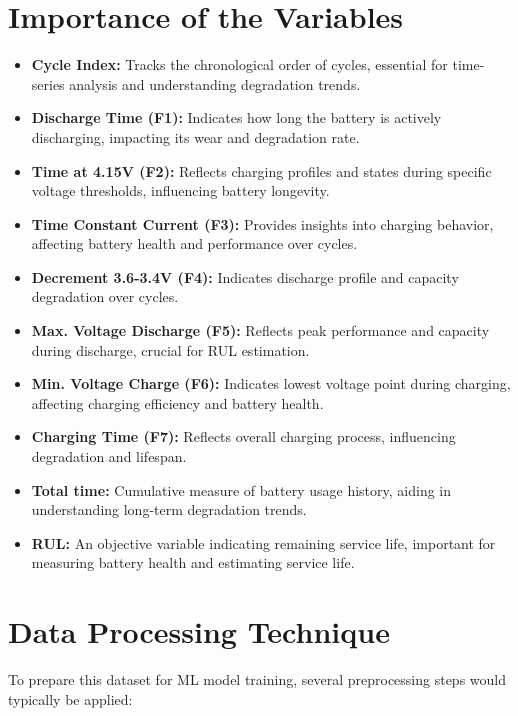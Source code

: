 \section{Importance of the Variables}

\begin{itemize}
    \item \textbf{Cycle Index:} Tracks the chronological order of cycles, essential for time-series analysis and understanding degradation trends.
    \item \textbf{Discharge Time (F1):} Indicates how long the battery is actively discharging, impacting its wear and degradation rate.
    \item \textbf{Time at 4.15V (F2):} Reflects charging profiles and states during specific voltage thresholds, influencing battery longevity.
    \item \textbf{Time Constant Current (F3):} Provides insights into charging behavior, affecting battery health and performance over cycles.
    \item \textbf{Decrement 3.6-3.4V (F4):} Indicates discharge profile and capacity degradation over cycles.
    \item \textbf{Max. Voltage Discharge (F5):} Reflects peak performance and capacity during discharge, crucial for RUL estimation.
    \item \textbf{Min. Voltage Charge (F6):} Indicates lowest voltage point during charging, affecting charging efficiency and battery health.
    \item \textbf{Charging Time (F7):} Reflects overall charging process, influencing degradation and lifespan.
    \item \textbf{Total time:} Cumulative measure of battery usage history, aiding in understanding long-term degradation trends.
    \item \textbf{RUL:} An objective variable indicating remaining service life, important for measuring battery health and estimating service life.
\end{itemize}

\section{Data Processing Technique}

To prepare this dataset for ML model training, several preprocessing steps would typically be applied:

